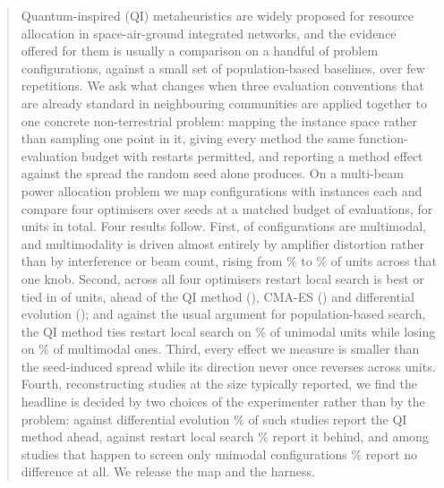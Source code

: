 \documentclass[runningheads]{llncs}
\begin{document}
\begin{abstract}
Quantum-inspired (QI) metaheuristics are widely proposed for resource allocation in
space-air-ground integrated networks, and the evidence offered for them is usually a comparison
on a handful of problem configurations, against a small set of population-based baselines, over
few repetitions. We ask what changes when three evaluation conventions that are already standard
in neighbouring communities are applied together to one concrete non-terrestrial problem: mapping
the instance space rather than sampling one point in it, giving every method the same
function-evaluation budget with restarts permitted, and reporting a method effect against the
spread the random seed alone produces. On a multi-beam power allocation problem we map
\numCells{} configurations with \numInst{} instances each and compare four optimisers over
\numSeeds{} seeds at a matched budget of \numBudget{} evaluations, for \numUnits{} units in
total. Four results follow. First, \numCellsMulti{} of \numCells{} configurations are multimodal,
and multimodality is driven almost entirely by amplifier distortion rather than by interference
or beam count, rising from \numKnobKappaLo\% to \numKnobKappaHi\% of units across that one knob.
Second, across all four optimisers restart local search is best or tied in \numRestartBest{} of
\numUnits{} units, ahead of the QI method (\numBestQpso{}), CMA-ES (\numBestCmaes{}) and
differential evolution (\numBestDe{}); and against the usual argument for population-based
search, the QI method ties restart local search on \numUniTiePct\% of unimodal units while
losing on \numMultiLossPct\% of multimodal ones. Third, every effect we measure is smaller than the seed-induced spread while its direction
never once reverses across \numUnits{} units. Fourth, reconstructing \numStudies{} studies at the
size typically reported, we find the headline is decided by two choices of the experimenter
rather than by the problem: against differential evolution \numSmallDeAhead\% of such studies
report the QI method ahead, against restart local search \numSmallRestartBehind\% report it
behind, and among studies that happen to screen only unimodal configurations \numAllUniTie\%
report no difference at all. We release the map and the harness.
\end{abstract}

\end{document}
